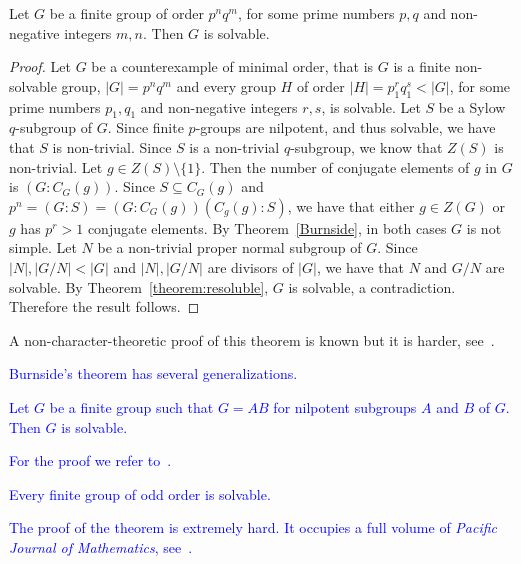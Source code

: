 \begin{theorem}
Let $G$ be a finite group of order $p^nq^m$, for some prime numbers $p,q$ and non-negative integers $m,n$. Then $G$ is solvable.
\end{theorem}

\begin{proof}
    Let $G$ be a counterexample of minimal order, that is $G$ is a finite non-solvable group, $|G|=p^nq^m$ and every group $H$ of order
    $|H|=p_1^{r}q_1^{s}<|G|$, for some prime numbers $p_1,q_1$ and non-negative integers $r,s$, is solvable.  Let $S$ be a Sylow $q$-subgroup of $G$. Since finite $p$-groups are nilpotent, and thus solvable, we have that $S$ is non-trivial. Since $S$ is a non-trivial $q$-subgroup, we know that $Z(S)$ is non-trivial. Let $g\in Z(S)\setminus\{ 1\}$. Then the number of conjugate elements of $g$ in $G$ is $(G:C_G(g))$. Since $S\subseteq C_G(g)$ and $p^n=(G:S)=(G:C_G(g))(C_g(g):S)$, we have that either $g\in Z(G)$ or $g$ has
    $p^r>1$ conjugate elements. By Theorem~\ref{Burnside}, in both cases $G$ is not simple. Let $N$ be a non-trivial proper normal subgroup of $G$. Since $|N|,|G/N|<|G|$ and $|N|,|G/N|$ are divisors of $|G|$, we have that $N$ and $G/N$ are solvable. By Theorem~\ref{theorem:resoluble}, $G$ is solvable, a contradiction. Therefore the result follows.
\end{proof}

A non-character-theoretic proof of this theorem is known but it is harder, see~\cite{MR2426855}.

\textcolor{blue}{Burnside's theorem has several generalizations.}
\textcolor{blue}{
\begin{theorem}
\label{thm:KegelWielandt}
Let $G$ be a finite group such that 
$G=AB$ for nilpotent subgroups $A$ and $B$ of $G$. Then $G$ is solvable.
\end{theorem}
}

\textcolor{blue}{For the proof we refer to~\cite[Theorem 2.4.3]{MR1211633}.}

\textcolor{blue}{
\begin{theorem}
\label{thm:FeitThompson}
Every finite group of odd order is solvable.
\end{theorem}}

\textcolor{blue}{
The proof of the theorem is extremely hard. It occupies a full volume of 
\emph{Pacific Journal of Mathematics}, see~\cite{MR166261}.}


